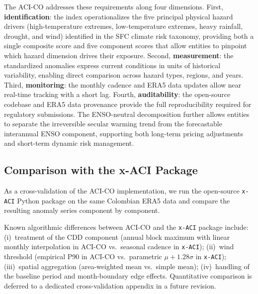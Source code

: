 \documentclass[12pt]{article}
\begin{document}
The ACI-CO addresses these requirements along four dimensions. First,
\textbf{identification}: the index operationalizes the five principal physical
hazard drivers (high-temperature extremes, low-temperature extremes, heavy
rainfall, drought, and wind) identified in the SFC climate risk taxonomy,
providing both a single composite score and five component scores that allow
entities to pinpoint which hazard dimension drives their exposure.
Second, \textbf{measurement}: the standardized anomalies express current
conditions in units of historical variability, enabling direct comparison
across hazard types, regions, and years.
Third, \textbf{monitoring}: the monthly cadence and ERA5 data updates allow
near real-time tracking with a short lag.
Fourth, \textbf{auditability}: the open-source codebase and ERA5 data
provenance provide the full reproducibility required for regulatory submissions.
The ENSO-neutral decomposition further allows entities to separate the
irreversible secular warming trend from the forecastable interannual ENSO
component, supporting both long-term pricing adjustments and short-term
dynamic risk management.
 
\subsection{Comparison with the x-ACI Package}
 
As a cross-validation of the ACI-CO implementation, we run the open-source \texttt{x-ACI} Python package \citep{milhaud2025xaci} on the same Colombian ERA5 data and compare the resulting anomaly series component by component.
 
\noindent Known algorithmic differences between ACI-CO and the \texttt{x-ACI} package include: (i)~treatment of the CDD component (annual block maximum with linear monthly interpolation in ACI-CO vs.\ seasonal cadence in \texttt{x-ACI}); (ii)~wind threshold (empirical P90 in ACI-CO vs.\ parametric $\mu + 1.28\sigma$ in \texttt{x-ACI}); (iii)~spatial aggregation (area-weighted mean vs.\ simple mean); (iv)~handling of the baseline period and month-boundary edge effects. Quantitative comparison is deferred to a dedicated cross-validation appendix in a future revision.
\end{document}
